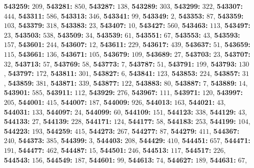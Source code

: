 \textsf{\bfseries 543259:} $209$, \textsf{\bfseries 543281:} $850$, \textsf{\bfseries 543287:} $138$, \textsf{\bfseries 543289:} $303$, \textsf{\bfseries 543299:} $322$, \textsf{\bfseries 543307:} $444$, \textsf{\bfseries 543311:} $586$, \textsf{\bfseries 543313:} $346$, \textsf{\bfseries 543341:} $99$, \textsf{\bfseries 543349:} $2$, \textsf{\bfseries 543353:} $87$, \textsf{\bfseries 543359:} $103$, \textsf{\bfseries 543379:} $318$, \textsf{\bfseries 543383:} $23$, \textsf{\bfseries 543407:} $10$, \textsf{\bfseries 543427:} $560$, \textsf{\bfseries 543463:} $113$, \textsf{\bfseries 543497:} $23$, \textsf{\bfseries 543503:} $538$, \textsf{\bfseries 543509:} $34$, \textsf{\bfseries 543539:} $61$, \textsf{\bfseries 543551:} $67$, \textsf{\bfseries 543553:} $43$, \textsf{\bfseries 543593:} $157$, \textsf{\bfseries 543601:} $244$, \textsf{\bfseries 543607:} $12$, \textsf{\bfseries 543611:} $229$, \textsf{\bfseries 543617:} $439$, \textsf{\bfseries 543637:} $51$, \textsf{\bfseries 543659:} $115$, \textsf{\bfseries 543661:} $136$, \textsf{\bfseries 543671:} $105$, \textsf{\bfseries 543679:} $109$, \textsf{\bfseries 543689:} $27$, \textsf{\bfseries 543703:} $23$, \textsf{\bfseries 543707:} $32$, \textsf{\bfseries 543713:} $57$, \textsf{\bfseries 543769:} $58$, \textsf{\bfseries 543773:} $7$, \textsf{\bfseries 543787:} $51$, \textsf{\bfseries 543791:} $199$, \textsf{\bfseries 543793:} $130$, \textsf{\bfseries 543797:} $172$, \textsf{\bfseries 543811:} $301$, \textsf{\bfseries 543827:} $6$, \textsf{\bfseries 543841:} $123$, \textsf{\bfseries 543853:} $224$, \textsf{\bfseries 543857:} $31$, \textsf{\bfseries 543859:} $381$, \textsf{\bfseries 543871:} $339$, \textsf{\bfseries 543877:} $122$, \textsf{\bfseries 543883:} $80$, \textsf{\bfseries 543887:} $7$, \textsf{\bfseries 543889:} $14$, \textsf{\bfseries 543901:} $585$, \textsf{\bfseries 543911:} $112$, \textsf{\bfseries 543929:} $276$, \textsf{\bfseries 543967:} $111$, \textsf{\bfseries 543971:} $120$, \textsf{\bfseries 543997:} $205$, \textsf{\bfseries 544001:} $415$, \textsf{\bfseries 544007:} $187$, \textsf{\bfseries 544009:} $926$, \textsf{\bfseries 544013:} $163$, \textsf{\bfseries 544021:} $43$, \textsf{\bfseries 544031:} $133$, \textsf{\bfseries 544097:} $24$, \textsf{\bfseries 544099:} $60$, \textsf{\bfseries 544109:} $151$, \textsf{\bfseries 544123:} $338$, \textsf{\bfseries 544129:} $43$, \textsf{\bfseries 544133:} $27$, \textsf{\bfseries 544139:} $228$, \textsf{\bfseries 544171:} $124$, \textsf{\bfseries 544177:} $58$, \textsf{\bfseries 544183:} $253$, \textsf{\bfseries 544199:} $104$, \textsf{\bfseries 544223:} $193$, \textsf{\bfseries 544259:} $415$, \textsf{\bfseries 544273:} $267$, \textsf{\bfseries 544277:} $87$, \textsf{\bfseries 544279:} $411$, \textsf{\bfseries 544367:} $240$, \textsf{\bfseries 544373:} $385$, \textsf{\bfseries 544399:} $3$, \textsf{\bfseries 544403:} $208$, \textsf{\bfseries 544429:} $410$, \textsf{\bfseries 544451:} $657$, \textsf{\bfseries 544471:} $191$, \textsf{\bfseries 544477:} $462$, \textsf{\bfseries 544487:} $15$, \textsf{\bfseries 544501:} $246$, \textsf{\bfseries 544513:} $117$, \textsf{\bfseries 544517:} $226$, \textsf{\bfseries 544543:} $156$, \textsf{\bfseries 544549:} $187$, \textsf{\bfseries 544601:} $99$, \textsf{\bfseries 544613:} $74$, \textsf{\bfseries 544627:} $189$, \textsf{\bfseries 544631:} $67$, 
